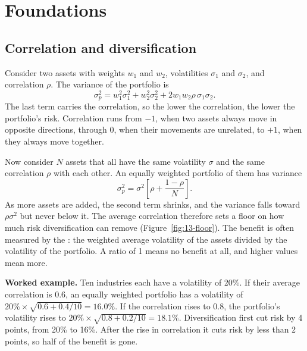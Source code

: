 \section{Foundations}
\label{sec:13-foundations}

\subsection{Correlation and diversification}

Consider two assets with weights $w_1$ and $w_2$, volatilities $\sigma_1$ and $\sigma_2$, and correlation $\rho$. The variance of the portfolio is
\begin{equation}
  \sigma_p^2 = w_1^2\sigma_1^2 + w_2^2\sigma_2^2 + 2w_1w_2\rho\,\sigma_1\sigma_2.
  \label{eq:13-var2}
\end{equation}
The last term carries the correlation, so the lower the correlation, the lower the portfolio's risk. Correlation runs from $-1$, when two assets always move in opposite directions, through 0, when their movements are unrelated, to $+1$, when they always move together. 

Now consider $N$ assets that all have the same volatility $\sigma$ and the same correlation $\rho$ with each other. An equally weighted portfolio of them has variance
\begin{equation}
  \sigma_p^2 = \sigma^2\left[\rho + \frac{1 - \rho}{N}\right].
  \label{eq:13-varN}
\end{equation}
As more assets are added, the second term shrinks, and the variance falls toward $\rho\sigma^2$ but never below it. The average correlation therefore sets a floor on how much risk diversification can remove (Figure~\ref{fig:13-floor}). The benefit is often measured by the : the weighted average volatility of the assets divided by the volatility of the portfolio. A ratio of 1 means no benefit at all, and higher values mean more.

\textbf{Worked example.} Ten industries each have a volatility of 20\%. If their average correlation is 0.6, an equally weighted portfolio has a volatility of $20\% \times \sqrt{0.6 + 0.4/10} = 16.0\%$. If the correlation rises to 0.8, the portfolio's volatility rises to $20\% \times \sqrt{0.8 + 0.2/10} = 18.1\%$. Diversification first cut risk by 4 points, from 20\% to 16\%. After the rise in correlation it cuts risk by less than 2 points, so half of the benefit is gone.

